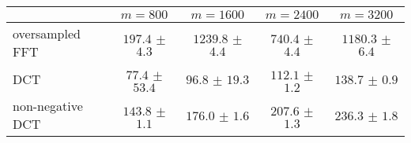 \centering
\renewcommand{\arraystretch}{1.2}
\begin{tabular}{@{}lcccc@{}}
\toprule
 & $m=800$ & $m=1600$ & $m=2400$ & $m=3200$\\
\midrule
oversampled FFT & $197.4$ $\pm$ $4.3$ & $1239.8$ $\pm$ $4.4$ & $740.4$ $\pm$ $4.4$ & $1180.3$ $\pm$ $6.4$ \\
DCT & $77.4$ $\pm$ $53.4$ & $96.8$ $\pm$ $19.3$ & $112.1$ $\pm$ $1.2$ & $138.7$ $\pm$ $0.9$ \\
non-negative DCT & $143.8$ $\pm$ $1.1$ & $176.0$ $\pm$ $1.6$ & $207.6$ $\pm$ $1.3$ & $236.3$ $\pm$ $1.8$ \\
\bottomrule
\end{tabular}
